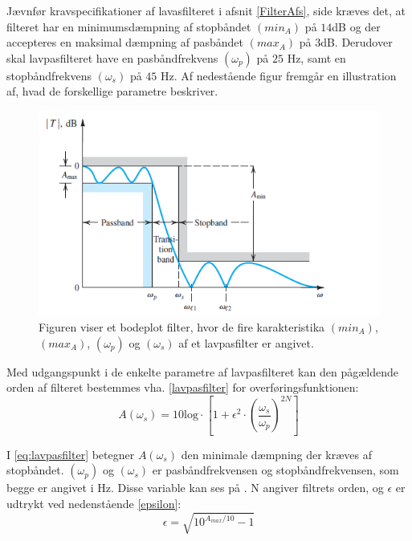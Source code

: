 Jævnfør kravspecifikationer af lavasfilteret i afsnit \ref{FilterAfs}, side \pageref{FilterAfs} kræves det, at filteret har en minimumsdæmpning af stopbåndet $(min_{A})$ på $14$dB og der accepteres en maksimal dæmpning af pasbåndet $(max_{A})$ på $3$dB. Derudover skal lavpasfilteret have en pasbåndfrekvens $(\omega_p)$ på $25$ Hz, samt en stopbåndfrekvens $(\omega_s)$ på $45$ Hz. Af nedestående figur  fremgår en illustration af, hvad de forskellige parametre beskriver.

\begin{figure}[H]
	\centering
	\includegraphics[scale=1]{figures/cProblemloesning/Lavpasfilter_generisk.PNG}
	\caption{Figuren viser et bodeplot filter, hvor de fire karakteristika $(min_{A})$, $(max_{A})$, $(\omega_p)$ og $(\omega_s)$ af et lavpasfilter er angivet. \cite{Carter2013}}
	\label{fig:Lavpasfilter_generisk}
\end{figure}
\noindent Med udgangspunkt i de enkelte parametre af lavpasfilteret kan den pågældende orden af filteret bestemmes vha. \eqref{lavpasfilter} for overføringsfunktionen:
\begin{equation} \label{eq:lavpasfilter}
A(\omega_s) = 10 \text{log} \cdot \left[1 + \epsilon^2 \cdot (\frac{\omega _s}{\omega _p})^{2N}\right] 
\end{equation}

\noindent I \eqref{eq:lavpasfilter} betegner $A(\omega _s)$ den minimale dæmpning der kræves af stopbåndet. $(\omega_p)$ og $(\omega_s)$ er pasbåndfrekvensen og stopbåndfrekvensen, som begge er angivet i Hz. Disse variable kan ses på . N angiver filtrets orden, og $\epsilon$ er udtrykt ved nedenstående \eqref{epsilon}:
\begin{equation}\label{eq:epsilon}
\epsilon = \sqrt{10^{A_{max} / 10} -1}
\end{equation}

